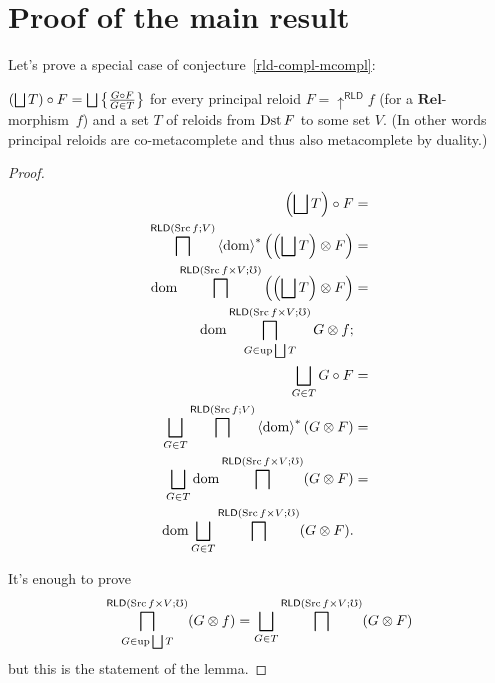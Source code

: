 \section{Proof of the main result}
Let's prove a special case of conjecture~\ref{rld-compl-mcompl}:
\begin{thm}
$\left(\bigsqcup T\right)\circ F=\bigsqcup\left\{ \frac{G\circ F}{G\in T}\right\}$
for every principal reloid $F=\uparrow^{\mathsf{RLD}}f$ (for a $\mathbf{Rel}$-morphism~$f$)
and a set $T$ of reloids from $\operatorname{Dst} F$ to some set $V$. (In other
words principal reloids are co-metacomplete and thus also metacomplete
by duality.)\end{thm}
\begin{proof}
~
\begin{align*}
\left(\bigsqcup T\right)\circ F & =\\
\bigsqcap^{\mathsf{RLD}(\operatorname{Src} f;V)}\left\langle \operatorname{dom}\right\rangle ^{\ast}\left(\left(\bigsqcup T\right)\otimes F\right) & =\\
\operatorname{dom}\bigsqcap^{\mathsf{RLD}(\operatorname{Src} f\times V;\mho)}\left(\left(\bigsqcup T\right)\otimes F\right) & =\\
\operatorname{dom}\bigsqcap_{G\in\operatorname{up}\bigsqcup T}^{\mathsf{RLD}(\operatorname{Src} f\times V;\mho)}G\otimes f;\\
\bigsqcup_{G\in T}G\circ F & =\\
\bigsqcup_{G\in T}\bigsqcap^{\mathsf{RLD}(\operatorname{Src} f;V)}\left\langle \operatorname{dom}\right\rangle ^{\ast}(G\otimes F) & =\\
\bigsqcup_{G\in T}\operatorname{dom}\bigsqcap^{\mathsf{RLD}(\operatorname{Src} f\times V;\mho)}(G\otimes F) & =\\
\operatorname{dom}\bigsqcup_{G\in T}\bigsqcap^{\mathsf{RLD}(\operatorname{Src} f\times V;\mho)}(G\otimes F).
\end{align*}


It's enough to prove
\[
\bigsqcap_{G\in\operatorname{up}\bigsqcup T}^{\mathsf{RLD}(\operatorname{Src} f\times V;\mho)}(G\otimes f)=\bigsqcup_{G\in T}\bigsqcap^{\mathsf{RLD}(\operatorname{Src} f\times V;\mho)}(G\otimes F)
\]
but this is the statement of the lemma.
\end{proof}

